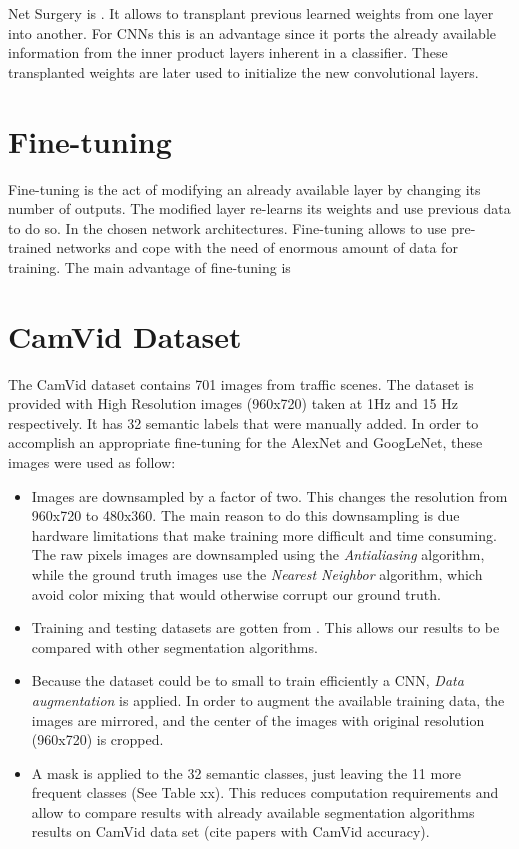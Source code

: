 Net Surgery is . It allows to transplant previous learned weights from one layer into another. For CNNs this is an advantage since it ports the already available information from the inner product layers inherent in a classifier.
These transplanted weights are later used to initialize the new convolutional layers.  

\section{Fine-tuning}
\label{Fine-tuning}

Fine-tuning is the act of modifying an already available layer by changing its number of outputs. The modified layer re-learns its weights and use previous data to do so. In the chosen network architectures.
Fine-tuning allows to use pre-trained networks and cope with the need of enormous amount of data for training. The main advantage of fine-tuning is 

\section{CamVid Dataset}
\label{CamVid Dataset}

The CamVid dataset \textcite{BrostowFC:PRL2008} contains 701 images from traffic scenes. The dataset is provided with High Resolution images (960x720) taken at 1Hz and 15 Hz respectively. It has 32 semantic labels that were manually added.
In order to accomplish an appropriate fine-tuning for the AlexNet and GoogLeNet, these images were used as follow:

\begin{itemize}
 \item Images are downsampled by a factor of two. This changes the resolution from 960x720 to 480x360. The main reason to do this downsampling is due hardware limitations that make training more difficult and time consuming. The raw pixels images are downsampled using the \textit{Antialiasing} algorithm, while the ground truth images use the \textit{Nearest Neighbor} algorithm, which avoid color mixing that would otherwise corrupt our ground truth.
 \item Training and testing datasets are gotten from \textcite {BrostowSFC:ECCV08}. This allows our results to be compared with other segmentation algorithms.
  \item Because the dataset could be to small to train efficiently a CNN, \textit{Data augmentation} is applied. In order to augment the available training data, the images are mirrored, and the center of the images with original resolution (960x720) is cropped. 
 \item A mask is applied to the 32 semantic classes, just leaving the 11 more frequent classes (See Table xx). This reduces computation requirements and allow to compare results with already available segmentation algorithms results on CamVid data set \textcite{} (cite papers with CamVid accuracy). 
\end{itemize}  

